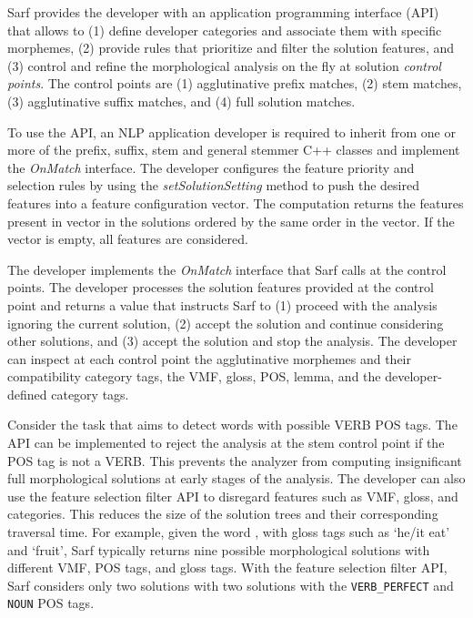 \label{s:api}
Sarf provides the developer with an application programming interface (API) 
  that allows to 
  (1) define developer categories and associate them with specific morphemes, 
  (2) provide rules that prioritize and filter the solution features, and 
  (3) control and refine the morphological analysis on the fly at solution {\em control points}.
%
The control points are (1) agglutinative prefix matches, (2) stem matches, 
(3) agglutinative suffix matches, and 
(4) full solution matches. 

To use the API, an NLP application developer is required to inherit from 
one or more of the prefix, suffix, stem and general 
stemmer C++ classes and implement the \textit{OnMatch} interface. 
The developer configures the feature priority and selection rules 
by using the \textit{setSolutionSetting} method to push the desired features 
into a feature configuration vector. 
The computation returns the features present in vector in the solutions ordered 
by the same order in the vector. 
If the vector is empty, all features are considered. 

The developer implements the \textit{OnMatch} interface that Sarf calls at the 
control points. 
The developer processes the solution features provided at the control point and returns 
a value that instructs Sarf to 
(1) proceed with the analysis ignoring the current solution, 
(2) accept the solution and continue considering other solutions, 
and (3) accept the solution and stop the analysis.
%
The developer can inspect at each control point 
the agglutinative morphemes and their compatibility category tags, 
the VMF, gloss, POS, lemma, and the developer-defined category tags. 

Consider the task that aims to detect words with possible VERB POS tags. 
The API can be implemented to reject the analysis at the stem control point if the POS tag is not a VERB. 
This prevents the analyzer from computing insignificant 
full morphological solutions at early stages of the analysis.
The developer can also use the feature selection filter API to 
disregard features such as VMF, gloss, and categories. 
This reduces the size of the solution trees and 
their corresponding traversal time. 
%
For example, given the word , 
with gloss tags such as `he/it eat' and `fruit',
Sarf typically returns nine possible morphological solutions 
with different VMF, POS tags, and gloss tags. 
With the feature selection filter API, Sarf considers only two solutions with 
two solutions with the {\tt VERB\_PERFECT} and {\tt NOUN} POS tags.

